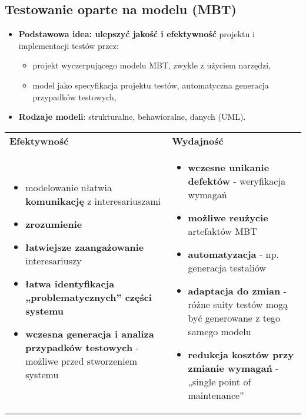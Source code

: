 \documentclass[../main.tex]{subfiles}
\begin{document}
    \subsection{Testowanie oparte na modelu (MBT)}

    \begin{itemize}
        \item \textbf{Podstawowa idea: ulepszyć jakość i efektywność} projektu i implementacji testów przez:
        \begin{itemize}
            \item projekt wyczerpującego modelu MBT, zwykle z użyciem narzędzi,
            \item model jako specyfikacja projektu testów, automatyczna generacja przypadków testowych,
        \end{itemize}
        \item \textbf{Rodzaje modeli}: strukturalne, behawioralne, danych (UML).
    \end{itemize}

    \begin{table}[H]
        \begin{center}
            \begin{tabular}{p{8cm} p{8cm}}
                \textbf{Efektywność} & \textbf{Wydajność} \\
                \begin{itemize}
                    \item modelowanie ułatwia \textbf{komunikację} z interesariuszami
                    \item \textbf{zrozumienie}
                    \item \textbf{łatwiejsze zaangażowanie} interesariuszy
                    \item \textbf{łatwa identyfikacja „problematycznych” części systemu}
                    \item \textbf{wczesna generacja i analiza przypadków testowych} - możliwe przed stworzeniem systemu
                \end{itemize}
                &
                \begin{itemize}
                    \item \textbf{wczesne unikanie defektów} - weryfikacja wymagań
                    \item \textbf{możliwe reużycie} artefaktów MBT
                    \item \textbf{automatyzacja} - np. generacja testaliów
                    \item \textbf{adaptacja do zmian} - różne suity testów mogą być generowane z tego samego modelu
                    \item \textbf{redukcja kosztów przy zmianie wymagań} - „single point of maintenance”
                \end{itemize} \\
            \end{tabular}
        \end{center}
    \end{table}
\end{document}
